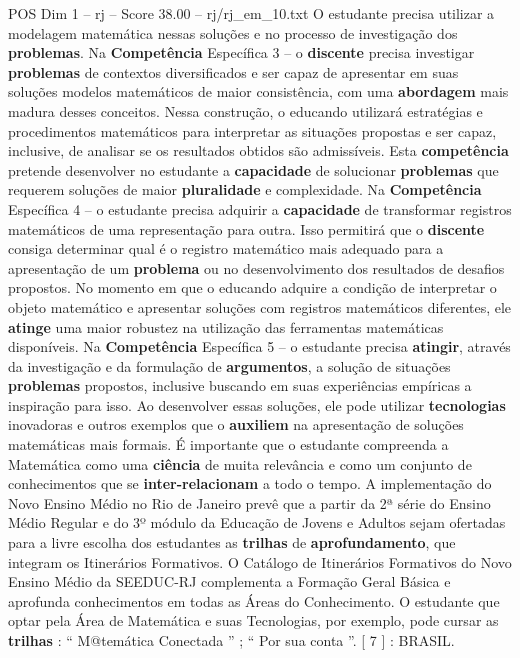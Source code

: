\begin{textsample}{POS Dim 1 – rj – Score 38.00 – rj/rj\_em\_10.txt}
O estudante precisa utilizar a modelagem matemática nessas soluções e no processo de investigação dos \textbf{problemas}.
Na \textbf{Competência} Específica 3 – o \textbf{discente} precisa investigar \textbf{problemas} de contextos diversificados e ser capaz de apresentar em suas soluções modelos matemáticos de maior consistência, com uma \textbf{abordagem} mais madura desses conceitos.
Nessa construção, o educando utilizará estratégias e procedimentos matemáticos para interpretar as situações propostas e ser capaz, inclusive, de analisar se os resultados obtidos são admissíveis.
Esta \textbf{competência} pretende desenvolver no estudante a \textbf{capacidade} de solucionar \textbf{problemas} que requerem soluções de maior \textbf{pluralidade} e complexidade.
Na \textbf{Competência} Específica 4 – o estudante precisa adquirir a \textbf{capacidade} de transformar registros matemáticos de uma representação para outra.
Isso permitirá que o \textbf{discente} consiga determinar qual é o registro matemático mais adequado para a apresentação de um \textbf{problema} ou no desenvolvimento dos resultados de desafios propostos.
No momento em que o educando adquire a condição de interpretar o objeto matemático e apresentar soluções com registros matemáticos diferentes, ele \textbf{atinge} uma maior robustez na utilização das ferramentas matemáticas disponíveis.
Na \textbf{Competência} Específica 5 – o estudante precisa \textbf{atingir}, através da investigação e da formulação de \textbf{argumentos}, a solução de situações \textbf{problemas} propostos, inclusive buscando em suas experiências empíricas a inspiração para isso.
Ao desenvolver essas soluções, ele pode utilizar \textbf{tecnologias} inovadoras e outros exemplos que o \textbf{auxiliem} na apresentação de soluções matemáticas mais formais.
É importante que o estudante compreenda a Matemática como uma \textbf{ciência} de muita relevância e como um conjunto de conhecimentos que se \textbf{inter-relacionam} a todo o tempo.
A implementação do Novo Ensino Médio no Rio de Janeiro prevê que a partir da 2ª série do Ensino Médio Regular e do 3º módulo da Educação de Jovens e Adultos sejam ofertadas para a livre escolha dos estudantes as \textbf{trilhas} de \textbf{aprofundamento}, que integram os Itinerários Formativos.
O Catálogo de Itinerários Formativos do Novo Ensino Médio da SEEDUC-RJ complementa a Formação Geral Básica e aprofunda conhecimentos em todas as Áreas do Conhecimento.
O estudante que optar pela Área de Matemática e suas Tecnologias, por exemplo, pode cursar as \textbf{trilhas} : “ M@temática Conectada ” ; “ Por sua conta ”. [ 7 ] : BRASIL.

\end{textsample}
